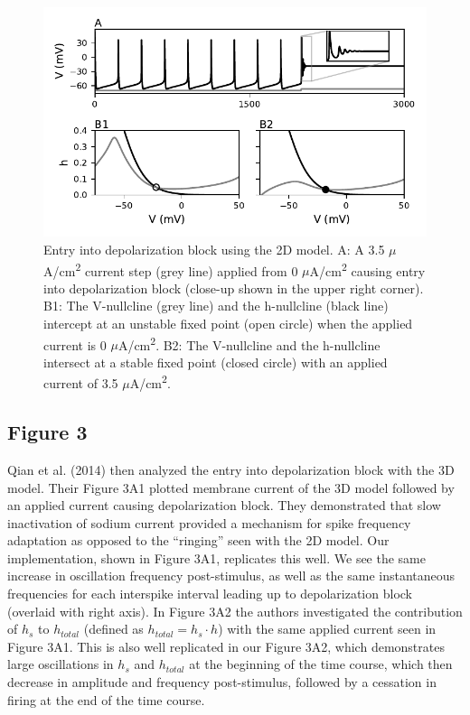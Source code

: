 \begin{figure}
	\centering
	\includegraphics[scale=0.7]{../figures/figure_2.pdf}
	\caption{Entry into depolarization block using the 2D model. A: A 3.5 $\mu$A/cm\textsuperscript{2} current step (grey line) applied from 0 $\mu$A/cm\textsuperscript{2} causing entry into depolarization block (close-up shown in the upper right corner). B1: The V-nullcline (grey line) and the h-nullcline (black line) intercept at an unstable fixed point (open circle) when the applied current is 0 $\mu$A/cm\textsuperscript{2}. B2: The V-nullcline and the h-nullcline intersect at a stable fixed point (closed circle) with an applied current of 3.5 $\mu$A/cm\textsuperscript{2}.}
	\label{fig:2}
\end{figure}

\subsection{Figure 3}
Qian et al. (2014) then analyzed the entry into depolarization block with the 3D model. Their Figure 3A1 plotted membrane current of the 3D model followed by an applied current causing depolarization block. They demonstrated that slow inactivation of sodium current provided a mechanism for spike frequency adaptation as opposed to the ``ringing'' seen with the 2D model. Our implementation, shown in Figure 3A1, replicates this well. We see the same increase in oscillation frequency post-stimulus, as well as the same instantaneous frequencies for each interspike interval leading up to depolarization block (overlaid with right axis). In Figure 3A2 the authors investigated the contribution of $h_s$ to $h_{total}$ (defined as $h_{total}= h_{s}\cdot h$) with the same applied current seen in Figure 3A1. This is also well replicated in our Figure 3A2, which demonstrates large oscillations in $h_s$ and $h_{total}$ at the beginning of the time course, which then decrease in amplitude and frequency post-stimulus, followed by a cessation in firing at the end of the time course.

